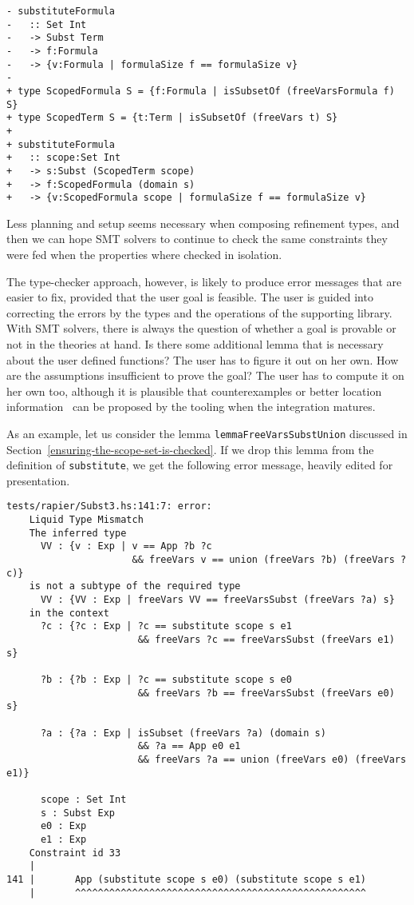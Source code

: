 \documentclass[sigconf, anonymous, review]{acmart}
\newcommand{\tc}[1]{{\small\texttt{#1}}}
\begin{document}
\begin{verbatim}
- substituteFormula
-   :: Set Int
-   -> Subst Term
-   -> f:Formula
-   -> {v:Formula | formulaSize f == formulaSize v}
-
+ type ScopedFormula S = {f:Formula | isSubsetOf (freeVarsFormula f) S}
+ type ScopedTerm S = {t:Term | isSubsetOf (freeVars t) S}
+
+ substituteFormula
+   :: scope:Set Int
+   -> s:Subst (ScopedTerm scope)
+   -> f:ScopedFormula (domain s)
+   -> {v:ScopedFormula scope | formulaSize f == formulaSize v}
\end{verbatim}

Less planning and setup seems necessary when composing refinement types, and
then we can hope SMT solvers to continue to check the same constraints
they were fed when the properties where checked in isolation.

The type-checker approach, however, is likely to produce error messages that
are easier to fix, provided that the user goal is feasible.
The user is guided into correcting the errors
by the types and the operations of the supporting library. With SMT solvers,
there is always the question of whether a goal is provable or not in the
theories at hand. Is there some additional lemma that is necessary about the user defined
functions? The user has to figure it out on her own. How are the assumptions
insufficient to prove the goal? The user has to compute it on her own too,
although it is plausible that counterexamples or better location information~\cite{webbers24}
can be proposed by the tooling when the integration matures.

As an example, let us consider the lemma \tc{lemma\-FreeVars\-Subst\-Union} discussed in
Section~\ref{ensuring-the-scope-set-is-checked}.
If we drop this lemma from the definition of \tc{substitute}, we get the following
error message, heavily edited for presentation.

\begin{verbatim}
tests/rapier/Subst3.hs:141:7: error:
    Liquid Type Mismatch
    The inferred type
      VV : {v : Exp | v == App ?b ?c
                      && freeVars v == union (freeVars ?b) (freeVars ?c)}
    is not a subtype of the required type
      VV : {VV : Exp | freeVars VV == freeVarsSubst (freeVars ?a) s}
    in the context
      ?c : {?c : Exp | ?c == substitute scope s e1
                       && freeVars ?c == freeVarsSubst (freeVars e1) s}

      ?b : {?b : Exp | ?c == substitute scope s e0
                       && freeVars ?b == freeVarsSubst (freeVars e0) s}

      ?a : {?a : Exp | isSubset (freeVars ?a) (domain s)
                       && ?a == App e0 e1
                       && freeVars ?a == union (freeVars e0) (freeVars e1)}

      scope : Set Int
      s : Subst Exp
      e0 : Exp
      e1 : Exp
    Constraint id 33
    |
141 |       App (substitute scope s e0) (substitute scope s e1)
    |       ^^^^^^^^^^^^^^^^^^^^^^^^^^^^^^^^^^^^^^^^^^^^^^^^^^^
\end{verbatim}
\end{document}
